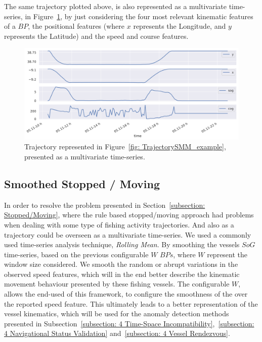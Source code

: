 The same trajectory plotted above, is also represented as a multivariate time-series, in Figure~\ref{fig: MTimeSeries_example}, by just considering the four most relevant kinematic features of a $BP$, the positional features (where $x$ represents the Longitude, and $y$ represents the Latitude) and the speed and course features. 


\begin{figure}[H]
\centering
\includegraphics[width=\textwidth]{figures/Ch3/ts_example.png}
\caption{Trajectory represented in Figure~\ref{fig: TrajectorySMM_example}, presented as a multivariate time-series.}
\label{fig: MTimeSeries_example}
\end{figure}

\subsection{Smoothed Stopped / Moving}
\label{subsection: Smoothed Stopped / Moving}
In order to resolve the problem presented in Section~\ref{subsection: Stopped/Moving}, where the rule based stopped/moving approach had problems when dealing with some type of fishing activity trajectories. 
And also as a trajectory could be overseen as a multivariate time-series. We used a commonly used time-series analysis technique, \emph{Rolling Mean}. 
By smoothing the vessels $SoG$ time-series, based on the previous configurable $W$ $BPs$, where $W$ represent the window size considered. We smooth the random or abrupt variations in the observed speed features, which will in the end better describe the kinematic movement behaviour presented by these fishing vessels. 
The configurable $W$, allows the end-used of this framework, to configure the smoothness of the over the reported speed feature. This ultimately leads to a better representation of the vessel kinematics, which will be used for the anomaly detection methods presented in Subsection~\ref{subsection: 4 Time-Space Incompatibility},~\ref{subsection: 4 Navigational Status Validation} and~\ref{subsection: 4 Vessel Rendezvous}.


